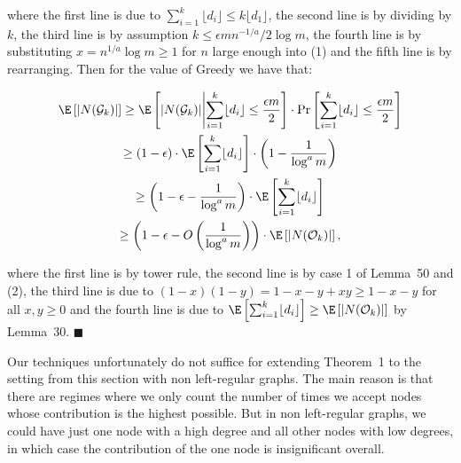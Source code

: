 \documentclass[10pt,a4paper]{article}
\begin{document}
where the first line is due to $\sum_{i=1}^{k}\lfloor d_{i}\rfloor\leq k\lfloor d_{1}\rfloor$, the second line is by dividing by $k$, the third line is by assumption $k\leq\epsilon mn^{-1/a}/2\log{m}$, the fourth line is by substituting $x=n^{1/a}\log{m}\geq 1$ for $n$ large enough into (1) and the fifth line is by rearranging.
Then for the value of Greedy we have that:\par


\[\begin{gathered}
\displaystyle\E\left[|N(\mathcal{G}_{k})|\right] \displaystyle\geq\E\left[|N(\mathcal{G}_{k})|\middle|\sum_{i=1}^{k}\lfloor d_{i}\rfloor\leq\frac{\epsilon m}{2}\right]\cdot\Pr\left[\sum_{i=1}^{k}\lfloor d_{i}\rfloor\leq\frac{\epsilon m}{2}\right] \\
\displaystyle\geq(1-\epsilon)\cdot\E\left[\sum_{i=1}^{k}\lfloor d_{i}\rfloor\right]\cdot\left(1-\frac{1}{\log^{a}{m}}\right) \\
\displaystyle\geq\left(1-\epsilon-\frac{1}{\log^{a}{m}}\right)\cdot\E\left[\sum_{i=1}^{k}\lfloor d_{i}\rfloor\right] \\
\displaystyle\geq\left(1-\epsilon-O\left(\frac{1}{\log^{a}{m}}\right)\right)\cdot\E\left[|N(\mathcal{O}_{k})|\right],
\end{gathered}\]


where the first line is by tower rule, the second line is by case 1 of Lemma 50 and (2), the third line is due to $(1-x)(1-y)=1-x-y+xy\geq 1-x-y$ for all $x,y\geq 0$ and the fourth line is due to $\E\left[\sum_{i=1}^{k}\lfloor d_{i}\rfloor\right]\geq\E\left[|N(\mathcal{O}_{k})|\right]$ by Lemma 30.
\ensuremath{\blacksquare}\par





Our techniques unfortunately do not suffice for extending Theorem 1 to the setting from this section with non left-regular graphs. The main reason is that there are regimes where we only count the number of times we accept nodes
whose contribution is the highest possible. But in non left-regular graphs, we could have
just one node with a high degree and all other nodes with low degrees, in which case the
contribution of the one node is insignificant overall.\par
\end{document}
